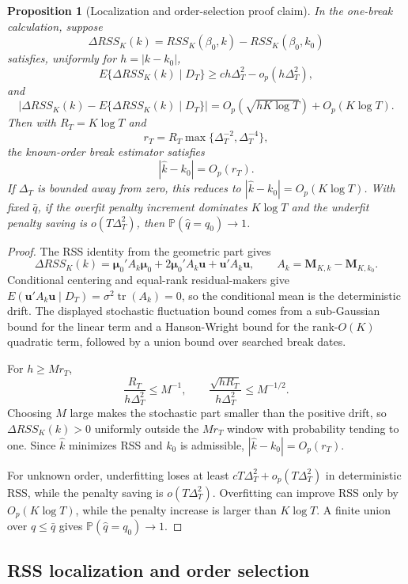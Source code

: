 \documentclass[12pt]{article}
\numberwithin{equation}{section}
\newtheorem{proposition}{Proposition}
\theoremstyle{definition}
\newcommand{\Pp}{\mathbb P}
\newcommand{\Op}{O_p}
\begin{document}
\begin{proposition}[Localization and order-selection proof claim]
\label{prop:part2-localization-order-proof-claim}
In the one-break calculation, suppose
\[
    \Delta RSS_K(k)
    =RSS_K(\beta_0,k)-RSS_K(\beta_0,k_0)
\]
satisfies, uniformly for \(h=|k-k_0|\),
\[
    E\{\Delta RSS_K(k)\mid D_T\}
    \ge c h\Delta_T^2-o_p(h\Delta_T^2),
\]
and
\[
    \left|\Delta RSS_K(k)-E\{\Delta RSS_K(k)\mid D_T\}\right|
    =\Op(\sqrt{hK\log T})+\Op(K\log T).
\]
Then with \(R_T=K\log T\) and
\[
    r_T=R_T\max\{\Delta_T^{-2},\Delta_T^{-4}\},
\]
the known-order break estimator satisfies
\[
    |\widehat k-k_0|=\Op(r_T).
\]
If \(\Delta_T\) is bounded away from zero, this reduces to
\(|\widehat k-k_0|=\Op(K\log T)\). With fixed \(\bar q\), if the overfit
penalty increment dominates \(K\log T\) and the underfit penalty saving is
\(o(T\Delta_T^2)\), then \(\Pp(\widehat q=q_0)\to1\).
\end{proposition}

\begin{proof}
The RSS identity from the geometric part gives
\[
    \Delta RSS_K(k)
    =\bm\mu_0'A_k\bm\mu_0
      +2\bm\mu_0'A_k\bm u+\bm u'A_k\bm u,
    \qquad A_k=\bm M_{K,k}-\bm M_{K,k_0}.
\]
Conditional centering and equal-rank residual-makers give
\(E(\bm u'A_k\bm u\mid D_T)=\sigma^2\operatorname{tr}(A_k)=0\), so the
conditional mean is the deterministic drift. The displayed stochastic
fluctuation bound comes from a sub-Gaussian bound for the linear term and a
Hanson-Wright bound for the rank-\(O(K)\) quadratic term, followed by a union
bound over searched break dates.

For \(h\ge Mr_T\),
\[
    \frac{R_T}{h\Delta_T^2}\le M^{-1},
    \qquad
    \frac{\sqrt{hR_T}}{h\Delta_T^2}\le M^{-1/2}.
\]
Choosing \(M\) large makes the stochastic part smaller than the positive drift,
so \(\Delta RSS_K(k)>0\) uniformly outside the \(Mr_T\) window with probability
tending to one. Since \(\widehat k\) minimizes RSS and \(k_0\) is admissible,
\(|\widehat k-k_0|=\Op(r_T)\).

For unknown order, underfitting loses at least \(cT\Delta_T^2+o_p(T\Delta_T^2)\)
in deterministic RSS, while the penalty saving is \(o(T\Delta_T^2)\). Overfitting
can improve RSS only by \(\Op(K\log T)\), while the penalty increase is larger
than \(K\log T\). A finite union over \(q\le\bar q\) gives
\(\Pp(\widehat q=q_0)\to1\).
\end{proof}
\subsection{RSS localization and order selection}
\end{document}
